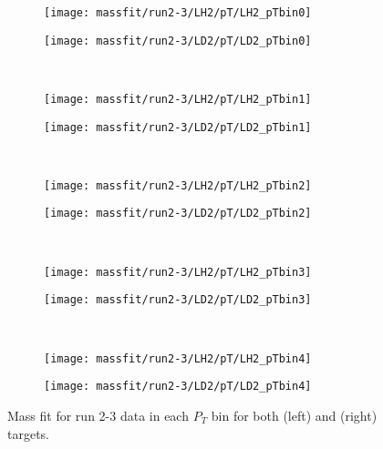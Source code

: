 \documentclass[../main.tex]{subfiles}
\begin{document}
\begin{figure}
	\centering
	\begin{subfigure}{0.4\linewidth}
		\texttt{[image: massfit/run2-3/LH2/pT/LH2\_pTbin0]}
	\end{subfigure}
	\begin{subfigure}{0.4\linewidth}
		\texttt{[image: massfit/run2-3/LD2/pT/LD2\_pTbin0]}
	\end{subfigure}\\
	\begin{subfigure}{0.4\linewidth}
		\texttt{[image: massfit/run2-3/LH2/pT/LH2\_pTbin1]}
	\end{subfigure}
	\begin{subfigure}{0.4\linewidth}
		\texttt{[image: massfit/run2-3/LD2/pT/LD2\_pTbin1]}
	\end{subfigure}\\
	\begin{subfigure}{0.4\linewidth}
		\texttt{[image: massfit/run2-3/LH2/pT/LH2\_pTbin2]}
	\end{subfigure}
	\begin{subfigure}{0.4\linewidth}
		\texttt{[image: massfit/run2-3/LD2/pT/LD2\_pTbin2]}
	\end{subfigure}\\
	\begin{subfigure}{0.4\linewidth}
		\texttt{[image: massfit/run2-3/LH2/pT/LH2\_pTbin3]}
	\end{subfigure}
	\begin{subfigure}{0.4\linewidth}
		\texttt{[image: massfit/run2-3/LD2/pT/LD2\_pTbin3]}
	\end{subfigure}\\
	\begin{subfigure}{0.4\linewidth}
		\texttt{[image: massfit/run2-3/LH2/pT/LH2\_pTbin4]}
	\end{subfigure}
	\begin{subfigure}{0.4\linewidth}
		\texttt{[image: massfit/run2-3/LD2/pT/LD2\_pTbin4]}
	\end{subfigure}
	\caption{Mass fit for run 2-3 data in each $P_T$ bin for both (left) and (right) targets. }
	\label{fig:massfit_57-70_pT}
\end{figure}
\end{document}
